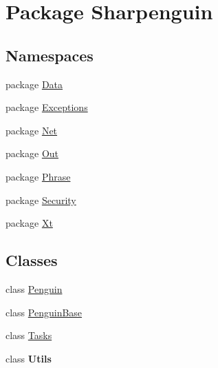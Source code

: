 \hypertarget{namespaceSharpenguin}{\section{Package Sharpenguin}
\label{namespaceSharpenguin}
}
\subsection*{Namespaces}
\begin{DoxyCompactItemize}
\item 
package \hyperlink{namespaceSharpenguin_1_1Data}{Data}
\item 
package \hyperlink{namespaceSharpenguin_1_1Exceptions}{Exceptions}
\item 
package \hyperlink{namespaceSharpenguin_1_1Net}{Net}
\item 
package \hyperlink{namespaceSharpenguin_1_1Out}{Out}
\item 
package \hyperlink{namespaceSharpenguin_1_1Phrase}{Phrase}
\item 
package \hyperlink{namespaceSharpenguin_1_1Security}{Security}
\item 
package \hyperlink{namespaceSharpenguin_1_1Xt}{Xt}
\end{DoxyCompactItemize}
\subsection*{Classes}
\begin{DoxyCompactItemize}
\item 
class \hyperlink{classSharpenguin_1_1Penguin}{Penguin}
\item 
class \hyperlink{classSharpenguin_1_1PenguinBase}{Penguin\-Base}
\item 
class \hyperlink{classSharpenguin_1_1Tasks}{Tasks}
\item 
class {\bfseries Utils}
\end{DoxyCompactItemize}
